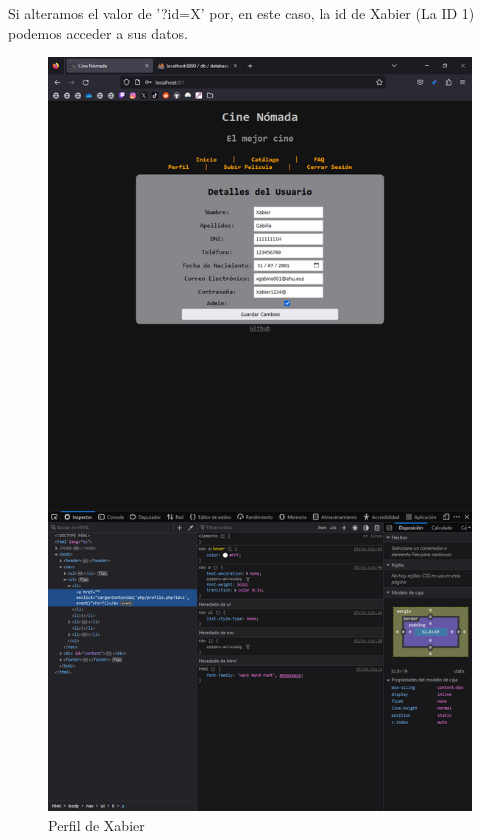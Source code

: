 \documentclass{report}
\begin{document}
                    Si alteramos el valor de '?id=X' por, en este caso, la id de Xabier (La ID 1) podemos acceder a sus datos.
                    \begin{figure}[H]
                        \centering
                        \includegraphics[width=\textwidth]{./img/vulnerabilidades/3.1/1.3.png}
                        \caption{Perfil de Xabier}
                    \end{figure}
\end{document}

